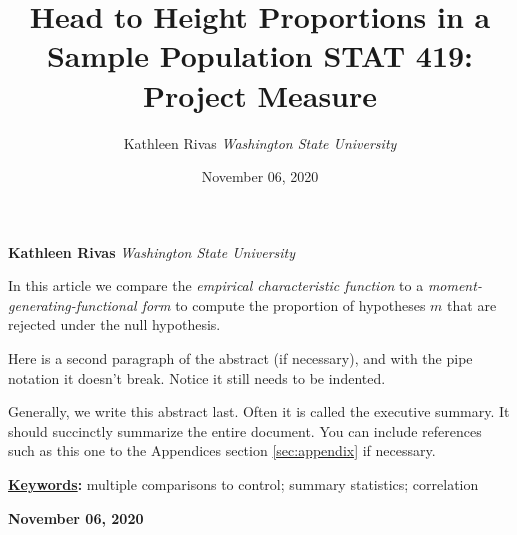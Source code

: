 \documentclass[]{article}
\title{\textbf{\textcolor{WSU.crimson}{Head to Height Proportions in a Sample Population}} \newline \textbf{\textcolor{WSU.gray}{STAT 419: Project Measure}}  }
\author{\Large Kathleen Rivas\vspace{0.05in} \newline\normalsize\emph{Washington State University}  }
\date{November 06, 2020}
\newcommand*{\authorfont}{\fontfamily{phv}\selectfont}
\renewenvironment{abstract}
{{%
  \setlength{\leftmargin}{0mm}
  \setlength{\rightmargin}{\leftmargin}%
}%
  \relax}
{\endlist}
\begin{document}
	
%

{%
\setlength{\parindent}{0pt}
\thispagestyle{plain}
{\fontsize{18}{20}\selectfont\raggedright 
\maketitle  %

}

{
   \vskip 13.5pt\relax \normalsize\fontsize{11}{12} 
   
\textbf{\authorfont Kathleen Rivas} \hskip 15pt \emph{\small Washington State University}   

}

}








\begin{abstract}

    \hbox{\vrule height .2pt width 39.14pc}

    \vskip 8.5pt %

\noindent In this article we compare the \emph{empirical characteristic function}
\citep{Tukey:1977, Becker:1988} to a
\emph{moment-generating-functional form} to compute the proportion of
hypotheses \(m\) that are rejected under the null hypothesis.
\vspace{0.25in}

\noindent Here is a second paragraph of the abstract (if necessary), and
with the pipe notation it doesn't break. Notice it still needs to be
indented. \vspace{0.25in}

\noindent Generally, we write this abstract last. Often it is called the
executive summary. It should succinctly summarize the entire document.
You can include references such as this one to the Appendices section
\ref{sec:appendix} if necessary.


\vskip 8.5pt \noindent \textbf{\underline{Keywords}:} multiple comparisons to control; summary statistics; correlation \par

    




    
    \hbox{\vrule height .2pt width 39.14pc}
    \vskip 5pt 
    \hfill \textbf{\textcolor{WSU.gray}{ November 06, 2020 } }
    \vskip 5pt 
    
\end{abstract}
\end{document}
